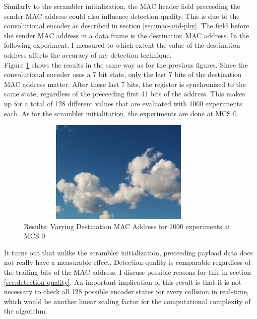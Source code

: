 Similarly to the scrambler initialization, the MAC header field preceeding the sender MAC address could also influence detection quality. This is due to the convolutional encoder as described in section \ref{sec:mac-and-phy}. The field before the sender MAC address in a data frame is the destination MAC address. In the following experiment, I measured to which extent the value of the destination address affects the accuracy of my detection technique.\\

Figure \ref{fig:vary_dest} shows the results in the same way as for the previous figures. Since the convolutional encoder uses a 7 bit state, only the last 7 bits of the destination MAC address matter. After these last 7 bits, the register is synchronized to the same state, regardless of the preceeding first 41 bits of the address. This makes up for a total of 128 different values that are evaluated with 1000 experiments each. As for the scrambler initialitation, the experiments are done at \gls{MCS} 0.

\begin{figure}[H]
	\centering
	\includegraphics[width=0.9\textwidth,height=5cm]{gfx/images/stock-clouds}
	\caption[Results: Varying Destination MAC Address for 1000 experiments]{Results: Varying Destination MAC Address for 1000 experiments at MCS 0}
	\label{fig:vary_dest}
\end{figure}

It turns out that unlike the scrambler initialization, preceeding payload data does not really have a measurable effect. Detection quality is comparable regardless of the trailing bits of the MAC address. I discuss possible reasons for this in section \ref{sec:detection-quality}. An important implication of this result is that it is not necessary to check all 128 possible encoder states for every collision in real-time, which would be another linear scaling factor for the computational complexity of the algorithm.



